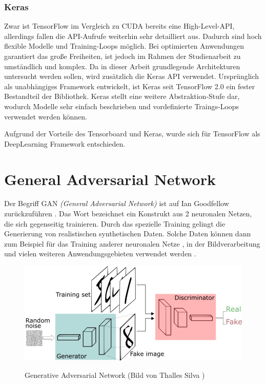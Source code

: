 \subsubsection{Keras}
Zwar ist TensorFlow im Vergleich zu CUDA bereits eine High-Level-API, allerdings fallen die API-Aufrufe weiterhin sehr detailliert aus.
Dadurch sind hoch flexible Modelle und Training-Loops möglich.
Bei optimierten Anwendungen garantiert das große Freiheiten, ist jedoch im Rahmen der Studienarbeit zu umständlich und komplex.
Da in dieser Arbeit grundlegende Architekturen untersucht werden sollen, wird zusätzlich die Keras API \cite{keras} verwendet.
Ursprünglich als unabhängiges Framework entwickelt, ist Keras seit TensorFlow 2.0 ein fester Bestandteil der Bibliothek.
Keras stellt eine weitere Abstraktion-Stufe dar, wodurch Modelle sehr einfach beschrieben und vordefinierte Traings-Loops verwendet werden können.
\newline

Aufgrund der Vorteile des Tensorboard und Keras, wurde sich für TensorFlow als DeepLearning Framework entschieden.

\section{General Adversarial Network}
Der Begriff GAN \textit{(General Adversarial Network)} ist auf Ian Goodfellow zurückzuführen \cite{gan-original-paper}.
Das Wort bezeichnet ein Konstrukt aus 2 neuronalen Netzen, die sich gegenseitig trainieren.
Durch das spezielle Training gelingt die Generierung von realistischen synthetischen Daten.
Solche Daten können dann zum Beispiel für das Training anderer neuronalen Netze \cite{gan-application-augmenting-training-data}, in der Bildverarbeitung \cite{gan-application-upscaling, gan-application-blending} und vielen weiteren Anwendungsgebieten verwendet werden \cite{gan-application-dna-optimizes-protein-functions, gan-application-audio-synthesis}.

\begin{figure}[H]
	\centering
	\includegraphics[width=12cm]{kapitel/2_stand_der_technik/img/GAN.png}
	\label{img:gan}
	\caption{Generative Adversarial Network (Bild von Thalles Silva \cite{img-gan})}
\end{figure}

